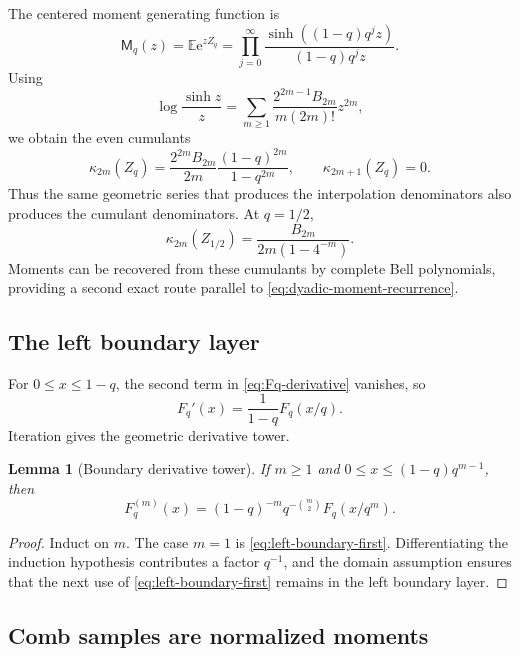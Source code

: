 \documentclass[11pt,a4paper,oneside]{article}
\newtheorem{lemma}[lemma]{Lemma}
\theoremstyle{definition}
\theoremstyle{remark}
\newcommand{\E}{\mathbb E}
\newcommand{\e}{\mathrm e}
\newcommand{\Mq}{\mathsf M_q}
\begin{document}
The centered moment generating function is
\begin{equation}
 \Mq(z)=\E\e^{zZ_q}
 =\prod_{j=0}^\infty
 \frac{\sinh((1-q)q^jz)}{(1-q)q^jz}.
 \label{eq:uq-mgf}
\end{equation}
Using
\[
 \log\frac{\sinh z}{z}
 =\sum_{m\ge1}\frac{2^{2m-1}B_{2m}}{m(2m)!}z^{2m},
\]
we obtain the even cumulants
\begin{equation}
 \kappa_{2m}(Z_q)
 =\frac{2^{2m}B_{2m}}{2m}
   \frac{(1-q)^{2m}}{1-q^{2m}},
 \qquad
 \kappa_{2m+1}(Z_q)=0.
 \label{eq:uq-cumulants}
\end{equation}
Thus the same geometric series that produces the interpolation denominators
also produces the cumulant denominators.  At $q=1/2$,
\begin{equation}
 \kappa_{2m}(Z_{1/2})
 =\frac{B_{2m}}{2m(1-4^{-m})}.
 \label{eq:up-cumulants}
\end{equation}
Moments can be recovered from these cumulants by complete Bell polynomials,
providing a second exact route parallel to \eqref{eq:dyadic-moment-recurrence}.

\subsection{The left boundary layer}

For $0\le x\le1-q$, the second term in \eqref{eq:Fq-derivative} vanishes, so
\begin{equation}
 F_q'(x)=\frac1{1-q}F_q(x/q).
 \label{eq:left-boundary-first}
\end{equation}
Iteration gives the geometric derivative tower.

\begin{lemma}[Boundary derivative tower]
\label{lem:boundary-tower}
If $m\ge1$ and $0\le x\le(1-q)q^{m-1}$, then
\begin{equation}
 F_q^{(m)}(x)
 =(1-q)^{-m}q^{-\binom m2}F_q(x/q^m).
 \label{eq:boundary-derivative-tower}
\end{equation}
\end{lemma}

\begin{proof}
Induct on $m$.  The case $m=1$ is
\eqref{eq:left-boundary-first}.  Differentiating the induction hypothesis
contributes a factor $q^{-1}$, and the domain assumption ensures that the next
use of \eqref{eq:left-boundary-first} remains in the left boundary layer.
\end{proof}

\subsection{Comb samples are normalized moments}
\end{document}
